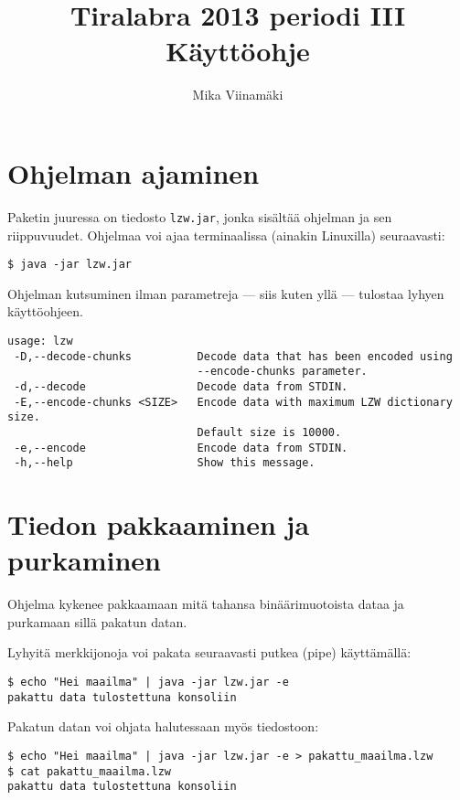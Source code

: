 \documentclass{article}
\begin{document}
\title{Tiralabra 2013 periodi III \\ Käyttöohje}
\author{Mika Viinamäki}
\maketitle

\section{Ohjelman ajaminen}

Paketin juuressa on tiedosto \verb+lzw.jar+, jonka sisältää ohjelman ja sen riippuvuudet. Ohjelmaa voi ajaa terminaalissa (ainakin Linuxilla) seuraavasti:

\begin{verbatim}
$ java -jar lzw.jar
\end{verbatim}

Ohjelman kutsuminen ilman parametreja --- siis kuten yllä --- tulostaa lyhyen käyttöohjeen.

\begin{verbatim}
usage: lzw
 -D,--decode-chunks          Decode data that has been encoded using
                             --encode-chunks parameter.
 -d,--decode                 Decode data from STDIN.
 -E,--encode-chunks <SIZE>   Encode data with maximum LZW dictionary size.
                             Default size is 10000.
 -e,--encode                 Encode data from STDIN.
 -h,--help                   Show this message.
\end{verbatim}

\section{Tiedon pakkaaminen ja purkaminen}
Ohjelma kykenee pakkaamaan mitä tahansa binäärimuotoista dataa ja purkamaan sillä pakatun datan.

Lyhyitä merkkijonoja voi pakata seuraavasti putkea (pipe) käyttämällä:
\begin{verbatim}
$ echo "Hei maailma" | java -jar lzw.jar -e
pakattu data tulostettuna konsoliin
\end{verbatim}

\begin{samepage}
Pakatun datan voi ohjata halutessaan myös tiedostoon:
\begin{verbatim}
$ echo "Hei maailma" | java -jar lzw.jar -e > pakattu_maailma.lzw
$ cat pakattu_maailma.lzw
pakattu data tulostettuna konsoliin
\end{verbatim}
\end{samepage}
\end{document}
